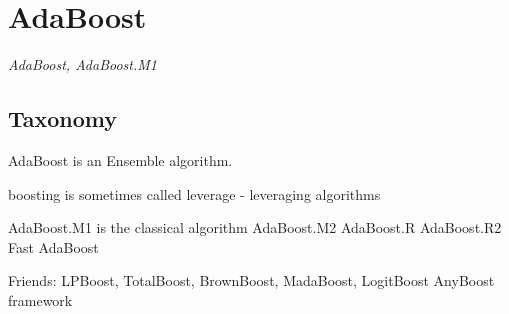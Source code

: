 

\section{AdaBoost} 
\label{sec:adaboost}

\emph{AdaBoost, AdaBoost.M1}

\subsection{Taxonomy}
AdaBoost is an Ensemble algorithm.

boosting is sometimes called leverage - leveraging algorithms

AdaBoost.M1 is the classical algorithm
AdaBoost.M2
AdaBoost.R
AdaBoost.R2
Fast AdaBoost


Friends: LPBoost, TotalBoost, BrownBoost, MadaBoost, LogitBoost
AnyBoost framework

